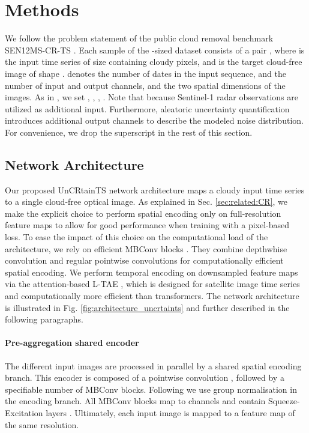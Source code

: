 \documentclass[10pt,twocolumn,letterpaper]{article}
\newcommand{\figref}[1]{ Fig. \ref{#1}}
\begin{document}
\section{Methods}

We follow the problem statement of the public cloud removal benchmark SEN12MS-CR-TS \cite{ebel2022sen12ms}. Each sample  of the -sized dataset consists of a pair , where  is the input time series of size  containing cloudy pixels, and  is the target cloud-free image of shape .  denotes the number of dates in the input sequence,  and  the number of input and output channels, and  the two spatial dimensions of the images.  As in \cite{ebel2022sen12ms}, we set , , , . Note that  because Sentinel-1 radar observations are utilized as additional input. Furthermore, aleatoric uncertainty quantification introduces additional output channels to describe the modeled noise distribution. For convenience, we drop the  superscript in the rest of this section. 


\subsection{Network Architecture}
Our proposed UnCRtainTS network architecture maps a cloudy input time series to a single cloud-free optical image. As explained in Sec. \ref{sec:related:CR}, we make the explicit choice to perform spatial encoding only on full-resolution feature maps to allow for good performance when training with a pixel-based loss. To ease the impact of this choice on the computational load of the architecture, we rely on efficient MBConv blocks \cite{sandler2018mobilenetv2}. They combine depthwhise convolution and regular pointwise convolutions for computationally efficient spatial encoding. We perform temporal encoding on downsampled feature maps via the attention-based L-TAE \cite{garnot2020lightweight},
which is designed for satellite image time series and computationally more efficient than transformers.
The network architecture is illustrated in \figref{fig:architecture_uncrtaints} and further described in the following paragraphs.

\paragraph{\bf Pre-aggregation shared encoder}
The  different input images are processed in parallel by a shared spatial encoding branch. This encoder is composed of a pointwise convolution , followed by a specifiable number  of MBConv blocks. Following \cite{garnot2021panoptic} we use group normalisation in the encoding branch.
All MBConv blocks map to  channels 
and contain Squeeze-Excitation layers \cite{hu2018squeeze}. Ultimately, each input image  is mapped to a feature map  of the same resolution.
\end{document}
